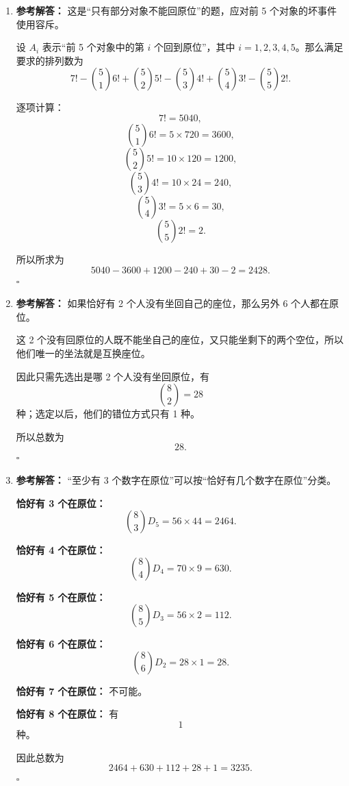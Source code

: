 \documentclass[11pt,a4paper,fontset=fandol]{ctexart}
\newenvironment{solution}{\par\noindent\textbf{参考解答：}}{\hfill$\square$\par}
\begin{document}
\begin{enumerate}
  \item \begin{solution}
  这是“只有部分对象不能回原位”的题，应对前 5 个对象的坏事件使用容斥。

  设 $A_i$ 表示“前 5 个对象中的第 $i$ 个回到原位”，其中 $i=1,2,3,4,5$。那么满足要求的排列数为
  \[
  7!-\binom51 6!+\binom52 5!-\binom53 4!+\binom54 3!-\binom55 2!.
  \]

  逐项计算：
  \[
  7!=5040,
  \]
  \[
  \binom51 6!=5\times 720=3600,
  \]
  \[
  \binom52 5!=10\times 120=1200,
  \]
  \[
  \binom53 4!=10\times 24=240,
  \]
  \[
  \binom54 3!=5\times 6=30,
  \]
  \[
  \binom55 2!=2.
  \]

  所以所求为
  \[
  5040-3600+1200-240+30-2=2428.
  \]
  \end{solution}

  \item \begin{solution}
  如果恰好有 2 个人没有坐回自己的座位，那么另外 6 个人都在原位。

  这 2 个没有回原位的人既不能坐自己的座位，又只能坐剩下的两个空位，所以他们唯一的坐法就是互换座位。

  因此只需先选出是哪 2 个人没有坐回原位，有
  \[
  \binom82=28
  \]
  种；选定以后，他们的错位方式只有 1 种。

  所以总数为
  \[
  28.
  \]
  \end{solution}

  \item \begin{solution}
  “至少有 3 个数字在原位”可以按“恰好有几个数字在原位”分类。

  \textbf{恰好有 3 个在原位：}
  \[
  \binom83 D_5=56\times 44=2464.
  \]

  \textbf{恰好有 4 个在原位：}
  \[
  \binom84 D_4=70\times 9=630.
  \]

  \textbf{恰好有 5 个在原位：}
  \[
  \binom85 D_3=56\times 2=112.
  \]

  \textbf{恰好有 6 个在原位：}
  \[
  \binom86 D_2=28\times 1=28.
  \]

  \textbf{恰好有 7 个在原位：}
  不可能。

  \textbf{恰好有 8 个在原位：}
  有
  \[
  1
  \]
  种。

  因此总数为
  \[
  2464+630+112+28+1=3235.
  \]
  \end{solution}
\end{enumerate}
\end{document}
